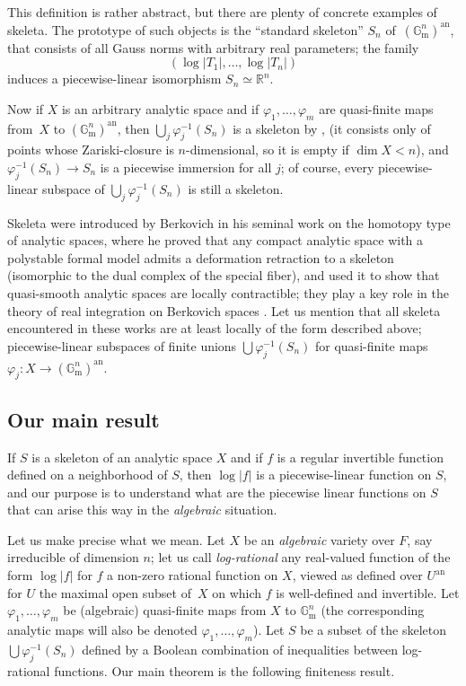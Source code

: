 \documentclass[JEP,XML,SOM,Unicode,ThmDefs,NoEqCountersInSection,published]{cedram}
\newcommand{\abs}[1]{\mathopen|#1\mathclose|}
\newcommand{\an}{^{\mathrm{an}}}
\newcommand{\gm}{\bG_{\mathrm m}}
\newcommand{\bG}{\mathbb G}
\newcommand{\R}{\mathbb R}
\let\phi\varphi
\theoremstyle{plain}
\theoremstyle{definition}
\begin{document}
This definition is rather abstract,
but there are plenty of concrete examples of skeleta.
The prototype of such objects is the ``standard skeleton''
$S_n$ of~$(\gm^n)\an$,
that consists of all Gauss norms with arbitrary
real parameters; the family
\[
(\log \abs{T_1},\ldots, \log\abs{T_n})
\]
induces a piecewise-linear isomorphism $S_n\simeq \R^n$.

Now if $X$ is an arbitrary analytic space
and if $\phi_1,\ldots, \phi_m$ are
quasi-finite maps from~$X$ to $(\gm^n)\an$, then
$\bigcup_j \phi_j^{-1}(S_n)$ is a skeleton by \cite[Th.\,5.1]{confluentes}, (it consists only of
points whose Zariski-closure is $n$\nobreakdash-dimen\-sional, so
it is empty if $\dim X<n$), and $\phi_j^{-1}(S_n)
\to S_n$ is a piecewise immersion for all $j$; of
course, every piecewise-linear subspace
of $\bigcup_j \phi_j^{-1}(S_n)$ is still a skeleton.

Skeleta were introduced by Berkovich in his
seminal work \cite{berkovich1999} on the homotopy type of analytic spaces, where he proved
that any compact analytic space with a polystable formal model admits a deformation retraction
to a skeleton (isomorphic to the dual complex of the special fiber), and used it to show that quasi-smooth analytic spaces
are locally contractible; they play a key role
in the theory of real integration on Berkovich spaces \cite{chambertloir-d2012}. Let us mention that all skeleta encountered in these works are at least locally of the form described above; \ie piecewise-linear subspaces of finite unions $\bigcup\phi_j^{-1}(S_n)$ for quasi-finite maps $\phi_j\colon X\to (\gm^n)\an$.

\subsection{Our main result}\label{sec:main-result}
If $S$ is a skeleton of an analytic space
$X$ and if $f$
is a regular invertible function
defined on a neighborhood of $S$, then $\log \abs f$
is a piecewise-linear function
on $S$, and our purpose is to understand
what are the piecewise linear functions
on $S$ that can arise this way in the \textit{algebraic}
situation.

Let us make precise what we mean. Let $X$ be an \textit{algebraic}
variety over $F$, say irreducible of
dimension $n$; let us call \textit{log-rational}
any real-valued function of the form $\log \abs f$
for $f$ a non-zero rational function on $X$,
viewed as defined over $U\an$ for $U$ the maximal
open subset of~$X$ on which $f$
is well-defined and invertible.
Let $\phi_1,\ldots, \phi_m$ be (algebraic)
quasi-finite maps from $X$ to $\gm^n$
(the corresponding analytic maps
will also be denoted $\phi_1,\ldots, \phi_m$).
Let $S$ be a subset of the skeleton $\bigcup \phi_j^{-1}(S_n)$
defined by a Boolean combination of
inequalities between log-rational functions.
Our main theorem is the following finiteness result.
\end{document}
